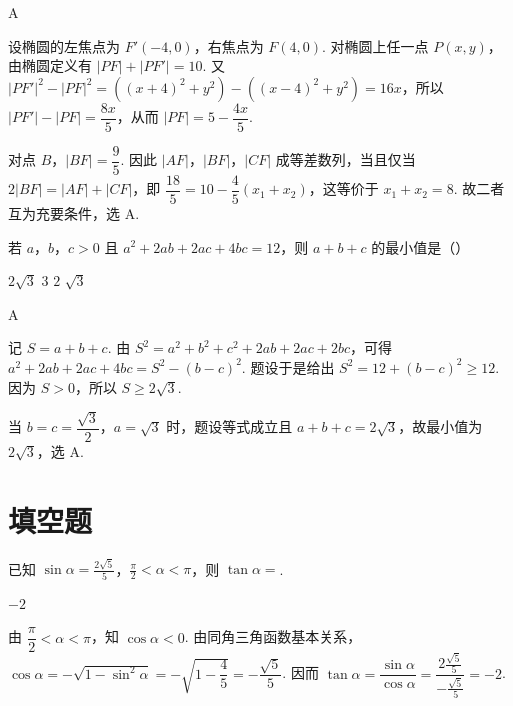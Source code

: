 \begin{answer}
A
\end{answer}

\begin{solution}
设椭圆的左焦点为 \(F'(-4,0)\)，右焦点为 \(F(4,0)\). 对椭圆上任一点 \(P(x,y)\)，由椭圆定义有 \(|PF|+|PF'|=10\). 又
\(|PF'|^2-|PF|^2=((x+4)^2+y^2)-((x-4)^2+y^2)=16x\)，所以
\(|PF'|-|PF|=\dfrac{8x}{5}\)，从而 \(|PF|=5-\dfrac{4x}{5}\).

对点 \(B\)，\(|BF|=\dfrac95\). 因此
\(|AF|\)，\(|BF|\)，\(|CF|\) 成等差数列，当且仅当 \(2|BF|=|AF|+|CF|\)，即
\(\dfrac{18}{5}=10-\dfrac45(x_1+x_2)\)，这等价于 \(x_1+x_2=8\). 故二者互为充要条件，选 A.
\end{solution}

\begin{problem}
若 \(a\)，\(b\)，\(c > 0\) 且 \(a^2 + 2ab + 2ac + 4bc = 12\)，则 \(a + b + c\) 的最小值是（\quad）

\choices
    {\(2\sqrt{3}\)}
    {\(3\)}
    {\(2\)}
    {\( \sqrt{3} \)}
\end{problem}

\begin{answer}
A
\end{answer}

\begin{solution}
记 \(S=a+b+c\). 由
\(S^2=a^2+b^2+c^2+2ab+2ac+2bc\)，可得
\(a^2+2ab+2ac+4bc=S^2-(b-c)^2\). 题设于是给出
\(S^2=12+(b-c)^2\geqslant12\). 因为 \(S>0\)，所以 \(S\geqslant2\sqrt3\).

当 \(b=c=\dfrac{\sqrt3}{2}\)，\(a=\sqrt3\) 时，题设等式成立且 \(a+b+c=2\sqrt3\)，故最小值为 \(2\sqrt3\)，选 A.
\end{solution}

\section{填空题}
\begin{problem}
已知 \(\sin \alpha = \frac{2\sqrt{5}}{5}\)，\(\frac{\pi}{2} < \alpha < \pi\)，则 \(\tan \alpha = \)\fillinblank{}.
\end{problem}

\begin{answer}
\(-2\)
\end{answer}

\begin{solution}
由 \(\dfrac\pi2<\alpha<\pi\)，知 \(\cos\alpha<0\). 由同角三角函数基本关系，
\(\cos\alpha=-\sqrt{1-\sin^2\alpha}=-\sqrt{1-\dfrac45}=-\dfrac{\sqrt5}{5}\). 因而
\(\tan\alpha=\dfrac{\sin\alpha}{\cos\alpha}=\dfrac{2\frac{\sqrt5}{5}}{-\frac{\sqrt5}{5}}=-2\).
\end{solution}

